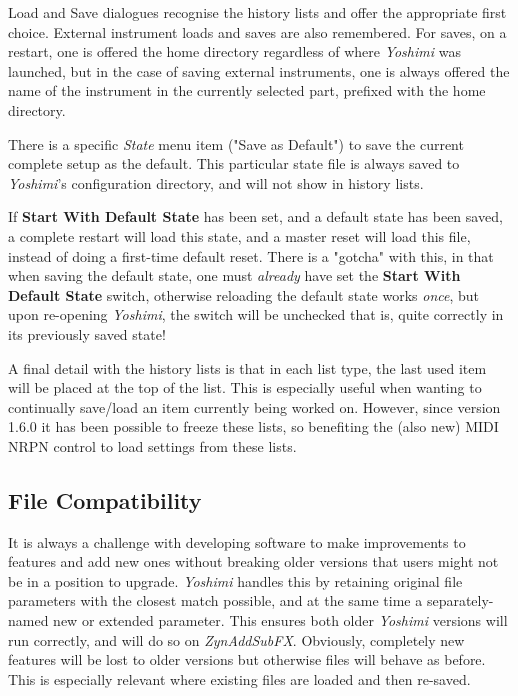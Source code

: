 \documentclass[
 11pt,
 twoside,
 a4paper,
 final                                 %
]{article}
\begin{document}
   Load and Save dialogues recognise the history lists and offer
   the appropriate first choice. External instrument loads and saves are
   also remembered.
   For saves, on a restart, one is offered the home directory regardless
   of where \textsl{Yoshimi} was launched, but in the case of saving
   external instruments, one is always offered the name of the instrument
   in the currently selected part, prefixed with the home directory.

   There is a specific \textsl{State} menu item ("Save as Default") to save
   the current complete setup as the default. This particular state file is
   always saved to \textsl{Yoshimi}'s configuration directory, and will not
   show in history lists.

   If \textbf{Start With Default State} has been set, and a
   default state has been saved, a complete restart will load this state,
   and a master reset will load this file, instead of doing a
   first-time default reset.
   There is a "gotcha" with this, in that when saving the default state,
   one must \textsl{already} have set the \textbf{Start With Default State}
   switch, otherwise reloading the default state works \textsl{once}, but
   upon re-opening \textsl{Yoshimi}, the switch will be unchecked
   \textemdash that is, quite correctly in its previously saved state!

   A final detail with the history lists is that in each list type, the last
   used item will be placed at the top of the list. This is especially useful
   when wanting to continually save/load an item currently being worked on.
   However, since version 1.6.0 it has been possible to freeze these lists,
   so benefiting the (also new) MIDI NRPN control to load settings from these
   lists.

\subsection{File Compatibility}
\label{subsec:file_compatibility}

   It is always a challenge with developing software to make improvements to
   features and add new ones without breaking older versions that users might
   not be in a position to upgrade. \textsl{Yoshimi} handles this by
   retaining original file parameters with the closest match possible, and at
   the same time a separately-named new or extended parameter. This ensures
   both older \textsl{Yoshimi} versions will run correctly,
   and will do so on \textsl{ZynAddSubFX}.
   Obviously, completely new features will be lost to
   older versions but otherwise files will behave as before. This is
   especially relevant where existing files are loaded and then re-saved.
\end{document}
